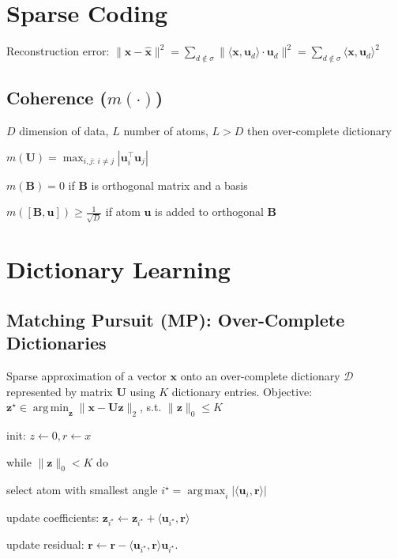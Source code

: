 \documentclass[a4paper, 11pt, landscape]{article}
\DeclareMathOperator*{\argmin}{arg\,min}
\DeclareMathOperator*{\argmax}{arg\,max}
\begin{document}
\begin{multicols*}{3}
\section{Sparse Coding}
Reconstruction error: $\|\mathbf{x}-\mathbf{\hat{x}}\|^2 = \sum_{d\notin\sigma}\| \langle\mathbf{x},\mathbf{u}_d \rangle \cdot \mathbf{u}_d \|^2 = \sum_{d\notin\sigma}\langle\mathbf{x},\mathbf{u}_d\rangle ^2$

\subsection{Coherence ($m(\cdot)$)}
\begin{compactitem}
	\item $D$ dimension of data, $L$ number of atoms, $L > D$ then over-complete dictionary
	\item $m(\mathbf{U}) = \max_{i,j:\, i \neq j} | \mathbf{u}_i^\top \mathbf{u}_j |$
	\item $m(\mathbf{B}) = 0$ if $\mathbf{B}$ is orthogonal matrix and a basis
	\item $m([\mathbf{B}, \mathbf{u}]) \geq \frac{1}{\sqrt{D}}$ if atom $\mathbf{u}$ is added to orthogonal $\mathbf{B}$
\end{compactitem}


\section{Dictionary Learning}

\subsection{Matching Pursuit (MP): Over-Complete Dictionaries}
Sparse approximation of a vector $\mathbf{x}$ onto an over-complete dictionary $\mathcal{D}$ represented by matrix $\mathbf{U}$ using $K$ dictionary entries.
Objective: $\mathbf{z}^\star \in \argmin_{\mathbf{z}} \|\mathbf{x} - \mathbf{Uz} \|_2$, s.t. $\|\mathbf{z}\|_0 \leq K$
\begin{compactenum}
	\item init: $z \leftarrow 0, r \leftarrow x$
	\item while $\|\mathbf{z}\|_0 < K$ do
	\item select atom with smallest angle $i^\star = \argmax_i |\langle \mathbf{u}_i, \mathbf{r} \rangle|$
	\item update coefficients: $\mathbf{z}_{i^\star} \leftarrow \mathbf{z}_{i^\star} + \langle \mathbf{u}_{i^\star}, \mathbf{r} \rangle$
	\item update residual: $\mathbf{r} \leftarrow \mathbf{r} - \langle \mathbf{u}_{i^\star}, \mathbf{r} \rangle \mathbf{u}_{i^\star}$.
\end{compactenum}


\end{multicols*}
\end{document}
